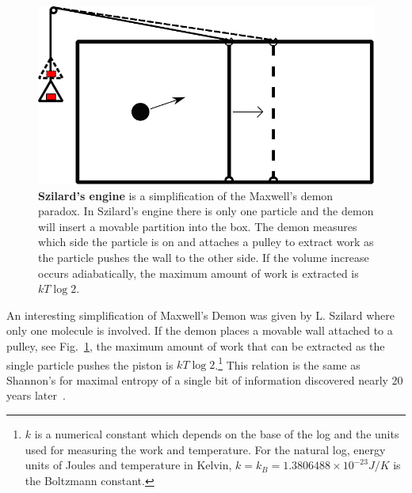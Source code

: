 \documentclass[11pt,oneside,final]{huthesis}%
\begin{document}
\begin{figure}
\begin{center}
\includegraphics[width=.5\columnwidth]{./figures/slz}
\end{center}
\caption{\textbf{Szilard's engine} is a simplification of the Maxwell's demon paradox.  In Szilard's engine there is only one particle and the demon will insert a movable partition into the box.  The demon measures which side the particle is on and attaches a pulley to extract work as the particle pushes the wall to the other side.  If the volume increase occurs adiabatically, the maximum amount of work is extracted is $kT\log 2$.
}
\label{fig:szilard}
\end{figure}
An interesting simplification of Maxwell's Demon was given by L. Szilard where only one molecule is involved.  If the demon places a movable wall attached to a pulley, see Fig.~\ref{fig:szilard}, the maximum amount of work that can be extracted as the single particle pushes the piston is $kT\log 2$.\footnote{$k$ is a numerical constant which depends on the base of the log and the units used for measuring the work and temperature.  For the natural log, energy units of Joules and temperature in Kelvin, $k=k_B=1.3806488\times 10^{-23}J/K$ is the Boltzmann constant.}   This relation is the same as Shannon's for maximal entropy of a single bit of information discovered nearly 20 years later~\cite{Shannon48}.
\end{document}
